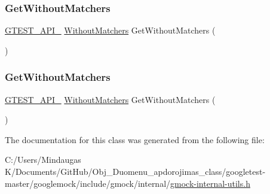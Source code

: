 \subsubsection{\texorpdfstring{GetWithoutMatchers}{GetWithoutMatchers}\hspace{0.1cm}{\footnotesize\ttfamily [2/3]}}
{\footnotesize\ttfamily \mbox{\hyperlink{_obj__test_2lib_2googletest-release-1_88_81_2googletest_2include_2gtest_2internal_2gtest-port_8h_aa73be6f0ba4a7456180a94904ce17790}{G\+T\+E\+S\+T\+\_\+\+A\+P\+I\+\_\+}} \mbox{\hyperlink{classtesting_1_1internal_1_1_without_matchers}{Without\+Matchers}} Get\+Without\+Matchers (\begin{DoxyParamCaption}{ }\end{DoxyParamCaption})\hspace{0.3cm}{\ttfamily [friend]}}

\mbox{\label{classtesting_1_1internal_1_1_without_matchers_aec6c0de08b3c9096e2365c023664a848}} 
\subsubsection{\texorpdfstring{GetWithoutMatchers}{GetWithoutMatchers}\hspace{0.1cm}{\footnotesize\ttfamily [3/3]}}
{\footnotesize\ttfamily \mbox{\hyperlink{_obj__test_2lib_2googletest-release-1_88_81_2googletest_2include_2gtest_2internal_2gtest-port_8h_aa73be6f0ba4a7456180a94904ce17790}{G\+T\+E\+S\+T\+\_\+\+A\+P\+I\+\_\+}} \mbox{\hyperlink{classtesting_1_1internal_1_1_without_matchers}{Without\+Matchers}} Get\+Without\+Matchers (\begin{DoxyParamCaption}{ }\end{DoxyParamCaption})\hspace{0.3cm}{\ttfamily [friend]}}



The documentation for this class was generated from the following file\+:\begin{DoxyCompactItemize}
\item 
C\+:/\+Users/\+Mindaugas K/\+Documents/\+Git\+Hub/\+Obj\+\_\+\+Duomenu\+\_\+apdorojimas\+\_\+class/googletest-\/master/googlemock/include/gmock/internal/\mbox{\hyperlink{googletest-master_2googlemock_2include_2gmock_2internal_2gmock-internal-utils_8h}{gmock-\/internal-\/utils.\+h}}\end{DoxyCompactItemize}
